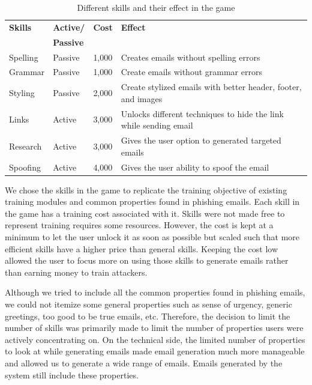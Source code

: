 \begin{table}[h]
    \centering
    \begin{tabular}{p{} p{}  p{}  p{}}
        \hline
        \textbf{Skills} & \textbf{Active/} & \textbf{Cost} & \textbf{Effect}                                                   \\
                        & \textbf{Passive} &               &                                                                   \\
        \hline
        Spelling        & Passive          & 1,000         & Creates emails without spelling errors                            \\
        Grammar         & Passive          & 1,000         & Create emails without grammar errors                              \\
        Styling         & Passive          & 2,000         & Create stylized emails with better header, footer, and images     \\
        Links           & Active           & 3,000         & Unlocks different techniques to hide the link while sending email \\
        Research        & Active           & 3,000         & Gives the user option to generated targeted emails                \\
        Spoofing        & Active           & 4,000         & Gives the user ability to spoof the email                         \\
        \hline
    \end{tabular}
    \caption{Different skills and their effect in the game}
    \label{table:attacker}
\end{table}

We chose the skills in the game to replicate the training objective of existing training modules and common properties found in phishing emails. Each skill in the game has a training cost associated with it. Skills were not made free to represent training requires some resources. However, the cost is kept at a minimum to let the user unlock it as soon as possible but scaled such that more efficient skills have a higher price than general skills. Keeping the cost low allowed the user to focus more on using those skills to generate emails rather than earning money to train attackers.

Although we tried to include all the common properties found in phishing emails, we could not itemize some general properties such as sense of urgency, generic greetings, too good to be true emails, etc. Therefore, the decision to limit the number of skills was primarily made to limit the number of properties users were actively concentrating on. On the technical side, the limited number of properties to look at while generating emails made email generation much more manageable and allowed us to generate a wide range of emails. Emails generated by the system still include these properties.

